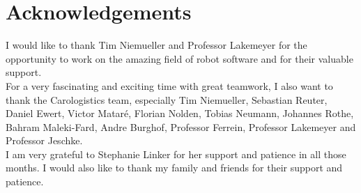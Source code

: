 \newpage

\section*{Acknowledgements}

I would like to thank Tim Niemueller and Professor Lakemeyer for the
opportunity to work on the amazing field of robot software and for
their valuable support.\\ For a very fascinating and exciting time
with great teamwork, I also want to thank the Carologistics team,
especially Tim Niemueller, Sebastian Reuter, Daniel Ewert, Victor
Matar\'{e}, Florian Nolden, Tobias Neumann, Johannes Rothe, Bahram
Maleki-Fard, Andre Burghof, Professor Ferrein, Professor Lakemeyer and
Professor Jeschke.\\ I am very grateful to Stephanie Linker
for her support and patience in all those months. I would also like to
thank my family and friends for their support and patience.
